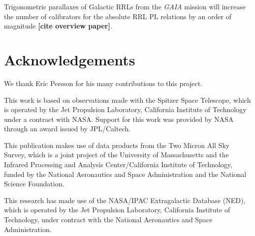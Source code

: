 \documentclass[a4paper,fleqn,usenatbib]{mnras}
\begin{document}
Trigonometric parallaxes of Galactic RRLs from the {\em GAIA} mission will increase the number of calibrators for the absolute RRL PL relations by an order of magnitude {\bf [cite overview paper]}. %

\section*{Acknowledgements}
\label{sec:acknowledgements}

We thank Eric Persson for his many contributions to this project.

This work is based on observations made with the Spitzer Space Telescope, which is operated by the Jet Propulsion Laboratory, California Institute of Technology under a contract with NASA. Support for this work was provided by NASA through an award issued by JPL/Caltech.

This publication makes use of data products from the Two Micron All Sky Survey, which is a joint project of the University of Massachusetts and the Infrared Processing and Analysis Center/California Institute of Technology, funded by the National Aeronautics and Space Administration and the National Science Foundation.

This research has made use of the NASA/IPAC Extragalactic Database (NED), which is operated by the Jet Propulsion Laboratory, California Institute of Technology, under contract with the National Aeronautics and Space Administration.












\clearpage
\newpage

\appendix
\end{document}
